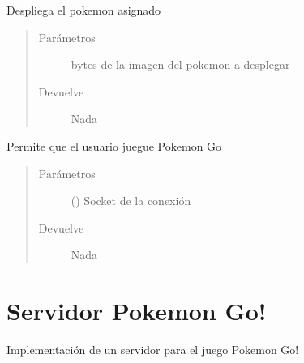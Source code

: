 \documentclass[letterpaper,10pt,spanish,openany,oneside]{sphinxmanual}
\begin{document}

\begin{fulllineitems}
\label{\detokenize{pokemonClient:pokemonClient.muestraPokemon}}
Despliega el pokemon asignado
\begin{quote}\begin{description}
\item[{Parámetros}] \leavevmode
{} \textendash{} bytes de la imagen del pokemon a desplegar

\item[{Devuelve}] \leavevmode
Nada

\end{description}\end{quote}

\end{fulllineitems}


\begin{fulllineitems}
\label{\detokenize{pokemonClient:pokemonClient.playPokemon}}
Permite que el usuario juegue Pokemon Go
\begin{quote}\begin{description}
\item[{Parámetros}] \leavevmode
{} () \textendash{} Socket de la conexión

\item[{Devuelve}] \leavevmode
Nada

\end{description}\end{quote}

\end{fulllineitems}



\section{Servidor Pokemon Go!}
\label{\detokenize{pokemonServer:servidor-pokemon-go}}\label{\detokenize{pokemonServer::doc}}
Implementación de un servidor para el juego Pokemon Go!
\end{document}
